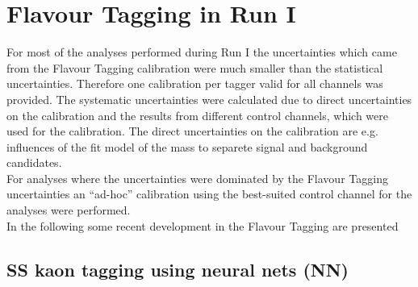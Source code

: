 \documentclass{PoS}
\begin{document}
\section{Flavour Tagging in Run I}\label{sec:4}

For most of the analyses performed during Run I the uncertainties which came from the Flavour Tagging calibration were much smaller than the statistical uncertainties. Therefore one calibration per tagger valid for all channels was provided. The systematic uncertainties were calculated due to direct uncertainties on the calibration and the results from different control channels, which were used for the calibration. The direct uncertainties on the calibration are e.g. influences of the fit model of the mass to separete signal and background candidates.\\
For analyses where the uncertainties were dominated by the Flavour Tagging uncertainties an \enquote{ad-hoc} calibration using the best-suited control channel for the analyses were performed. \\
In the following some recent development in the Flavour Tagging are presented

\subsection{SS kaon tagging using neural nets (NN)}
\end{document}
